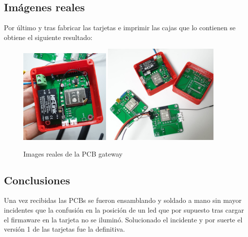 \documentclass[a4paper ,12pt, onecolumn]{article}
\begin{document}
    \subsection{Imágenes reales}
        Por último y tras fabricar las tarjetas e imprimir las cajas que lo contienen se obtiene el siguiente resultado:
        \begin{center}
            \begin{figure}[ht]
                \centering
                \includegraphics[width=0.4\textwidth]{../3d_antenna.jpeg}
                \includegraphics[width=0.51\textwidth]{../real_master_pcb.jpeg}
                \caption{Images reales de la PCB gateway}
                \label{fig:mesh7}
            \end{figure}    
        \end{center}
    \subsection{Conclusiones}
        Una vez recibidas las PCBs se fueron ensamblando y soldado a mano sin mayor incidentes que la confusión en la 
        posición de un led que por supuesto tras cargar el firmaware en la tarjeta no se iluminó.
        Solucionado el incidente y por suerte el versión 1 de las tarjetas fue la definitiva.
\end{document}
